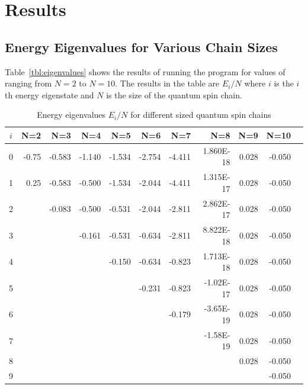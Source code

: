 \documentclass[a4paper]{IEEEtran}
\begin{document}
\section{Results}

    \subsection*{Energy Eigenvalues for Various Chain Sizes} 
    Table~\ref{tbl:eigenvalues} shows the results of running the program for values of ranging
    from $N=2$ to $N=10$. The results in the table are $E_i/N$ where $i$ is the
    $i$th energy eigenstate and $N$ is the size of the quantum spin chain.

    \begin{table}[ht] 
        \caption{Energy eigenvalues $E_i/N$ for different sized quantum spin chains} 
        \label{tble:eigenvalues} 
    \begin{center} 
        \begin{tabular}{|c|r|r|r|r|r|r|r|r|r|r|} \hline 
      $i$ & N=2   & N=3    & N=4    & N=5    & N=6    & N=7    & N=8       & N=9   & N=10\\ \hline  \hline
        0 & -0.75 & -0.583 & -1.140 & -1.534 & -2.754 & -4.411 & 1.860E-18 & 0.028 & -0.050 \\ \hline
        1 &  0.25 & -0.583 & -0.500 & -1.534 & -2.044 & -4.411 & 1.315E-17 & 0.028 & -0.050 \\ \hline
        2 &       & -0.083 & -0.500 & -0.531 & -2.044 & -2.811 & 2.862E-17 & 0.028 & -0.050 \\ \hline
        3 &       &        & -0.161 & -0.531 & -0.634 & -2.811 & 8.822E-18 & 0.028 & -0.050 \\ \hline
        4 &       &        &        & -0.150 & -0.634 & -0.823 & 1.713E-18 & 0.028 & -0.050 \\ \hline
        5 &       &        &        &        & -0.231 & -0.823 & -1.02E-17 & 0.028 & -0.050 \\ \hline
        6 &       &        &        &        &        & -0.179 & -3.65E-19 & 0.028 & -0.050 \\ \hline
        7 &       &        &        &        &        &        & -1.58E-19 & 0.028 & -0.050 \\ \hline
        8 &       &        &        &        &        &        &           & 0.028 & -0.050 \\ \hline
        9 &       &        &        &        &        &        &           &       & -0.050 \\ \hline
        \end{tabular}
    \end{center}
    \end{table} 
\end{document}
